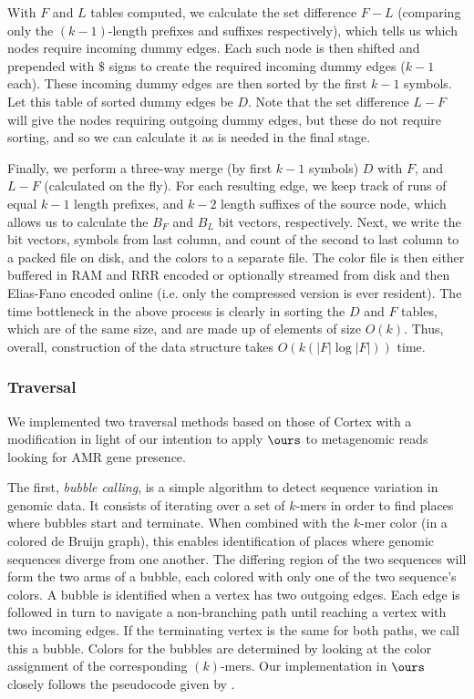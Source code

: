 \documentclass[doctor]{thesis}
\begin{document}
With $F$ and $L$ tables computed, we calculate the set difference $F-L$ (comparing only the $(k-1)$-length prefixes and suffixes respectively), which tells us which nodes require incoming dummy edges. Each such node is then
shifted and prepended with $\$$ signs to create the required incoming dummy edges ($k-1$ each). These incoming dummy edges are then sorted by the first $k-1$ symbols.
Let this table of sorted dummy edges be $D$. Note that the set difference $L - F$ will give the nodes requiring outgoing dummy edges, but these do not require sorting, and so we can calculate it as is needed in the final stage.

Finally, we perform a three-way merge (by first $k-1$ symbols) $D$ with $F$, and $L-F$ (calculated on the fly). For each resulting edge, we keep track of runs of equal $k-1$ length prefixes,
and $k-2$ length suffixes of the source node, which allows us to calculate the $B_F$ and $B_L$ bit vectors, respectively. Next, we write the bit vectors, symbols from last column, and
count of the second to last column to a packed file on disk, and the colors to a separate file.   The color file is then either buffered in RAM and RRR encoded or optionally streamed from disk and then Elias-Fano encoded online (i.e. only the compressed version is ever resident).  The time bottleneck in the above process is clearly in sorting the $D$ and $F$ tables, which are of the same size, and are made up of elements of size $O(k)$. Thus, overall, construction of the data structure takes $O(k(|F|\log|F|))$ time.



 

\subsubsection{Traversal}
We implemented two traversal methods based on those of {\sc Cortex} with a modification in light of our intention to apply $\ours$ to metagenomic reads looking for AMR gene presence.

The first, {\it bubble calling}, is a simple algorithm to detect sequence variation in genomic data. It consists of iterating over a set of $k$-mers in order to find places where bubbles start and terminate.  When combined with the $k$-mer color (in a colored de Bruijn graph), this enables identification of places where genomic sequences diverge from one another.  The differing region of the two sequences will form the two arms of a bubble, each colored with only one of the two sequence's colors.  A bubble is identified when a vertex has two outgoing edges. Each edge is followed in turn to navigate a non-branching path until reaching a vertex with two incoming edges. If the terminating vertex is the same for both paths, we call this a bubble. Colors for the bubbles are determined by looking at the color assignment of the corresponding $(k)$-mers. Our implementation in $\ours$ closely follows the pseudocode given by \cite{ICTFM12}.
\end{document}
